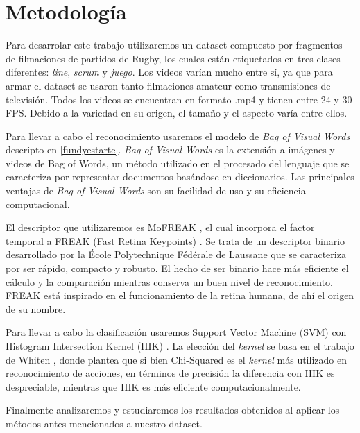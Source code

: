 \section{Metodología}
\iffalse
Se recomienda estructurar esta sección en función de los objetivos específicos.
* Planteo de la hipotesis a analizar en cada objetivo o seccion del proyecto.
* Actividades propuestas y metodologıa a usar en cada una de ellas.
* Resultados que se esperan obtener o metas a cumplir y como se evaluaran
los resultados.
Trate de evaluar los potenciales problemas y limitaciones de la metodolog ́ıa
y t ́ecnicas propuestas y en lo posible proponer alternativas.
\fi

Para desarrolar este trabajo utilizaremos un dataset compuesto por fragmentos de filmaciones de partidos de Rugby, los cuales están etiquetados en
tres clases diferentes: \textit{line}, \textit{scrum} y \textit{juego}. Los videos varían mucho entre sí, ya que para armar el dataset se usaron
tanto filmaciones amateur como transmisiones de televisión. Todos los videos se encuentran en formato .mp4 y tienen entre 24 y 30 FPS. Debido a la
variedad en su origen, el tamaño y el aspecto varía entre ellos.

Para llevar a cabo el reconocimiento usaremos el modelo de \textit{Bag of Visual Words} descripto en \ref{fundyestarte}. \textit{Bag of Visual Words}
es la extensión a imágenes y videos de Bag of Words, un método utilizado en el procesado del lenguaje que se caracteriza por representar documentos
basándose en diccionarios. Las principales ventajas de \textit{Bag of Visual Words} son su facilidad de uso y su eficiencia computacional.

El descriptor que utilizaremos es MoFREAK \parencite{whiten2013mofreak}, el cual incorpora el factor temporal a FREAK (Fast Retina Keypoints) \parencite{alahi2012freak}.
Se trata de un descriptor binario desarrollado por la École Polytechnique Fédérale de Laussane que se caracteriza por ser rápido, compacto y robusto.
El hecho de ser binario hace más eficiente el cálculo y la comparación mientras conserva un buen nivel de reconocimiento. FREAK está inspirado
en el funcionamiento de la retina humana, de ahí el origen de su nombre.

Para llevar a cabo la clasificación usaremos Support Vector Machine (SVM) con Histogram Intersection Kernel (HIK) \parencite{barla2003histogram}. La
elección del \textit{kernel} se basa en el trabajo de Whiten \parencite{whiten2013mofreak}, donde plantea que si bien Chi-Squared es el \textit{kernel}
más utilizado en reconocimiento de acciones, en términos de precisión la diferencia con HIK es despreciable, mientras que HIK es más eficiente
computacionalmente.

Finalmente analizaremos y estudiaremos los resultados obtenidos al aplicar los métodos antes mencionados a nuestro dataset.
